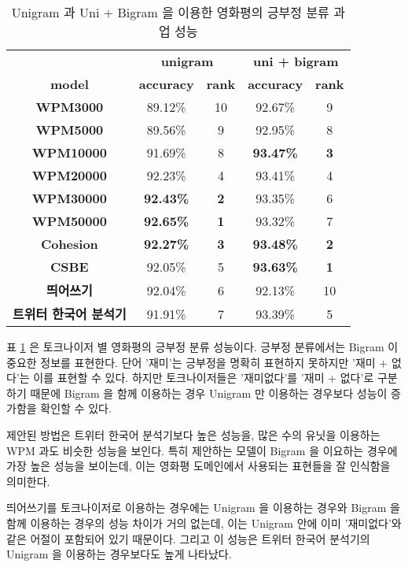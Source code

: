 \documentclass[oneside, ko,phd]{snuthesis_utf8_kor}
\begin{document}
\begin{table}[ht]
\centering
\caption{Unigram 과 Uni + Bigram 을 이용한 영화평의 긍부정 분류 과업 성능}
\label{tab:sentiment_performance}
\begin{tabular}{|
>{}c |c|c|c|c|}
\hline
 & \multicolumn{2}{c|}{\textbf{unigram}} & \multicolumn{2}{c|}{\textbf{uni + bigram}} \\ \cline{2-5} 
\multirow{-2}{*}{\textbf{model}} & \textbf{accuracy} & \textbf{rank} & \textbf{accuracy} & \textbf{rank} \\ \hline
\textbf{WPM3000} & 89.12\% & 10 & 92.67\% & 9 \\ \hline
\textbf{WPM5000} & 89.56\% & 9 & 92.95\% & 8 \\ \hline
\textbf{WPM10000} & 91.69\% & 8 & {\textbf{93.47\%}} & {\textbf{3}} \\ \hline
\textbf{WPM20000} & 92.23\% & 4 & 93.41\% & 4 \\ \hline
\textbf{WPM30000} & {\textbf{92.43\%}} & {\textbf{2}} & 93.35\% & 6 \\ \hline
\textbf{WPM50000} & {\textbf{92.65\%}} & {\textbf{1}} & 93.32\% & 7 \\ \hline
\textbf{Cohesion} & {\textbf{92.27\%}} & {\textbf{3}} & {\textbf{93.48\%}} & {\textbf{2}} \\ \hline
\textbf{CSBE} & 92.05\% & 5 & {\textbf{93.63\%}} & {\textbf{1}} \\ \hline
\textbf{띄어쓰기} & 92.04\% & 6 & 92.13\% & 10 \\ \hline
\textbf{트위터 한국어 분석기} & 91.91\% & 7 & 93.39\% & 5 \\ \hline
\end{tabular}%
\end{table}

표 \ref{tab:sentiment_performance} 은 토크나이저 별 영화평의 긍부정 분류 성능이다.
긍부정 분류에서는 Bigram 이 중요한 정보를 표현한다.
단어 '재미'는 긍부정을 명확히 표현하지 못하지만 '재미 + 없다'는 이를 표현할 수 있다.
하지만 토크나이저들은 '재미없다'를 '재미 + 없다'로 구분하기 때문에 Bigram 을 함께 이용하는 경우 Unigram 만 이용하는 경우보다 성능이 증가함을 확인할 수 있다.

제안된 방법은 트위터 한국어 분석기보다 높은 성능을, 많은 수의 유닛을 이용하는 WPM 과도 비슷한 성능을 보인다.
특히 제안하는 모델이 Bigram 을 이요하는 경우에 가장 높은 성능을 보이는데, 이는 영화평 도메인에서 사용되는 표현들을 잘 인식함을 의미한다.

띄어쓰기를 토크나이저로 이용하는 경우에는 Unigram 을 이용하는 경우와 Bigram 을 함께 이용하는 경우의 성능 차이가 거의 없는데, 이는 Unigram 안에 이미 '재미없다'와 같은 어절이 포함되어 있기 때문이다.
그리고 이 성능은 트위터 한국어 분석기의 Unigram 을 이용하는 경우보다도 높게 나타났다.
\end{document}
